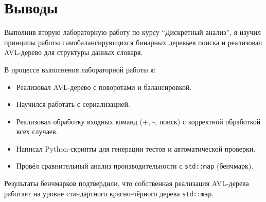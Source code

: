 \section{Выводы}

Выполнив вторую лабораторную работу по курсу \enquote{Дискретный анализ}, я изучил принципы работы самобалансирующихся бинарных деревьев поиска и реализовал AVL-дерево для структуры данных словаря.

В процессе выполнения лабораторной работы я:
\begin{itemize}
    \item Реализовал AVL-дерево с поворотами и балансировкой.
    \item Научился работать с сериализацией.
    \item Реализовал обработку входных команд (+, -, поиск) с корректной обработкой всех случаев.
    \item Написал Python-скрипты для генерации тестов и автоматической проверки.
    \item Провёл сравнительный анализ производительности с \texttt{std::map} (бенчмарк).
\end{itemize}

Результаты бенчмарков подтвердили, что собственная реализация AVL-дерева работает на уровне стандартного красно-чёрного дерева \texttt{std::map}.
\pagebreak